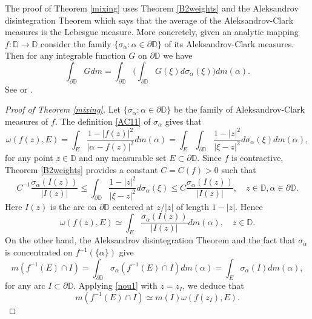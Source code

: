 \documentclass[a4paper,12pt]{article}
\theoremstyle{definition}
\numberwithin{equation}{section}
\newcommand{\D}{\mathbb D}
\begin{document}
The proof of Theorem \ref{mixing} uses Theorem \ref{B2weights} and the Aleksandrov disintegration Theorem which says that the average of the Aleksandrov-Clark measures is the Lebesgue measure. More concretely, given an analytic mapping $f: \D \rightarrow \D$ consider the family $\{\sigma_\alpha : \alpha \in \partial \D\}$ of its Aleksandrov-Clark measures. Then for any integrable function $G$ on $\partial \D$ we have
\begin{equation}
    \label{ADT}
    \int_{\partial \D} G dm = \int_{\partial \D}  \bigg( \int_{\partial \D} G(\xi) d \sigma_\alpha (\xi) \bigg) dm (\alpha) . 
\end{equation}
See \cite{PolSar} or \cite{Saks}. 


\begin{proof}[Proof of Theorem \ref{mixing}]
    
Let $\{ \sigma_{\alpha}: \alpha \in \partial \mathbb{D} \}$ be the family of Aleksandrov-Clark measures of $f$. The definition \eqref{AC11} of $\sigma_\alpha$ gives that
$$
\omega (f(z), E)= \int_{E} \frac{1-|f(z)|^{2}}{\left|\alpha -f(z)\right|^{2}} d m(\alpha)= 
 \int_{E} \int_{\partial \mathbb{D}} \frac{1-|z|^{2}}{|\xi-z|^{2}} d \sigma_{\alpha}(\xi) d m (\alpha) , 
$$
for any point $z \in \D$ and any measurable set $E \subset \partial \D $. Since $f$ is contractive, Theorem \ref{B2weights} provides a constant $C=C(f) >0$ such that 
\begin{equation}
    \label{0}
 C^{-1} \frac{\sigma_{\alpha}\left(I(z) \right)}{\left|I(z) \right|} \leq \int_{\partial \mathbb{D}} \frac{1-|z|^{2}}{|\xi -z|^{2}} d \sigma_{\alpha}(\xi) \leq C \frac{\sigma_{\alpha}\left(I(z) \right)}{\left|I(z) \right|}, \quad z \in \D, \alpha \in \partial \D . 
\end{equation}
Here $I(z)$ is the arc on $\partial \D$ centered at $z/|z|$ of length $1-|z|$. Hence
\begin{equation}
    \label{nou1}
    \omega(f(z), E) \simeq \int_{E} \frac{\sigma_{\alpha}\left(I(z) \right)}{\left|I(z) \right|} dm(\alpha), \quad z \in \mathbb{D} . 
\end{equation}
On the other hand, the Aleksandrov disintegration Theorem and the fact that $\sigma_{\alpha}$ is concentrated on $f^{-1} (\{\alpha \}) $ give
$$
 m\left(f^{-1}(E) \cap I \right)=\int_{\partial \D} \sigma_{\alpha}\left(f^{-1}(E) \cap I \right) d m(\alpha)
 =\int_{E} \sigma_{\alpha}(I) dm (\alpha) , 
$$
for any arc $I \subset \partial \D$. Applying \eqref{nou1} with $z=z_I$, we deduce that
$$
m\left(f^{-1}(E) \cap I\right) \simeq m(I) \omega \left(f(z_{I}), E \right) .
$$ 


\end{proof}
\end{document}

